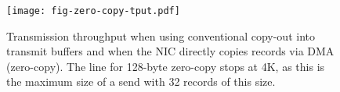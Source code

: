\begin{figure}[t]
\texttt{[image: fig-zero-copy-tput.pdf]}
\caption{Transmission throughput when using conventional copy-out into transmit
buffers and when the NIC directly copies records via DMA (zero-copy). The
line for 128-byte zero-copy stops at 4K, as this is the maximum size of a send
with 32 records of this size. }
\label{fig:zero-copy-tput}
\end{figure}
